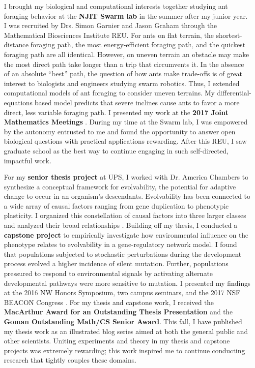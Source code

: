 I brought my biological and computational interests together studying ant foraging behavior at the \textbf{NJIT Swarm lab} in the summer after my junior year.
I was recruited by Drs. Simon Garnier and Jason Graham through the Mathematical Biosciences Institute REU.
For ants on flat terrain, the shortest-distance foraging path, the most energy-efficient foraging path, and the quickest foraging path are all identical.
However, on uneven terrain an obstacle may make the most direct path take longer than a trip that circumvents it.
In the absence of an absolute ``best'' path, the question of how ants make trade-offs is of great interest to biologists and engineers studying swarm robotics.
Thus, I extended computational models of ant foraging to consider uneven terrains.
My differential-equations based model predicts that severe inclines cause ants to favor a more direct, less variable foraging path.
I presented my work at the \textbf{2017 Joint Mathematics Meetings} \cite{jmm}.
During my time at the Swarm lab, I was empowered by the autonomy entrusted to me and found the opportunity to answer open biological questions with practical applications rewarding.
After this REU, I saw graduate school as the best way to continue engaging in such self-directed, impactful work.

For my \textbf{senior thesis project} at UPS, I worked with Dr. America Chambers to synthesize a conceptual framework for evolvability, the potential for adaptive change to occur in an organism's descendants.
Evolvability has been connected to a wide array of causal factors ranging from gene duplication to phenotypic plasticity.
I organized this constellation of causal factors into three larger classes and analyzed their broad relationships \cite{thesis}.
Building off my thesis, I conducted a \textbf{capstone project} to empirically investigate how environmental influence on the phenotype relates to evolvability in a gene-regulatory network model.
I found that populations subjected to stochastic perturbations during the development process evolved a higher incidence of silent mutation.
Further, populations pressured to respond to environmental signals by activating alternate developmental pathways were more sensitive to mutation.
I presented my findings at the 2016 NW Honors Symposium, two campus seminars, and the 2017 NSF BEACON Congress \cite{beacon}.
For my thesis and capstone work, I received the \textbf{MacArthur Award for an Outstanding Thesis Presentation} and the \textbf{Goman Outstanding Math/CS Senior Award}.
This fall, I have published my thesis work as an illustrated blog series aimed at both the general public and other scientists.
Uniting experiments and theory in my thesis and capstone projects was extremely rewarding;
this work inspired me to continue conducting research that tightly couples these domains.
